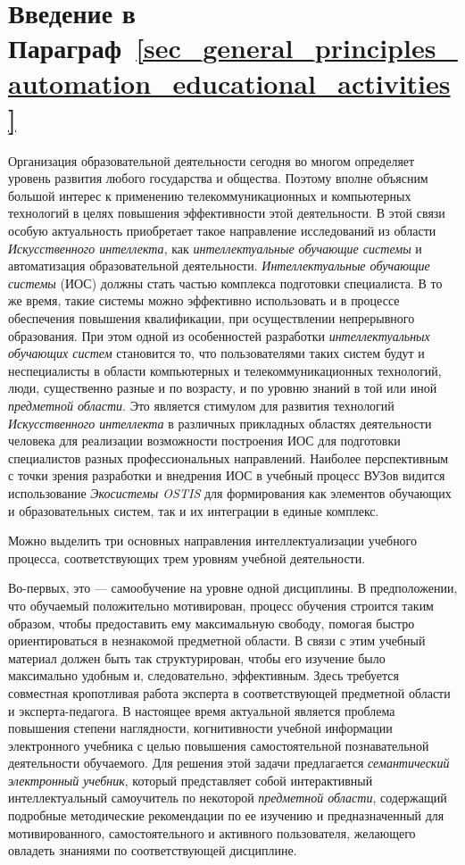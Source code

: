 \section*{Введение в Параграф~\ref{sec_general_principles_automation_educational_activities}}
Организация образовательной деятельности сегодня во многом определяет уровень развития любого государства и общества. Поэтому вполне объясним большой интерес к применению телекоммуникационных и компьютерных технологий в целях повышения эффективности этой деятельности. В этой связи особую актуальность приобретает такое направление исследований из области \textit{Искусственного интеллекта}, как \textit{интеллектуальные обучающие системы} и автоматизация образовательной деятельности. \textit{Интеллектуальные обучающие системы} (ИОС) должны стать частью комплекса подготовки специалиста. В то же время, такие системы можно эффективно использовать и в процессе обеспечения повышения квалификации, при осуществлении непрерывного образования. При этом одной из особенностей разработки \textit{интеллектуальных обучающих систем} становится то, что пользователями таких систем будут и неспециалисты в области компьютерных и телекоммуникационных технологий, люди, существенно разные и по возрасту, и по уровню знаний в той или иной \textit{предметной области}. Это является стимулом для развития технологий \textit{Искусственного интеллекта} в различных прикладных областях деятельности человека для реализации возможности построения ИОС для подготовки специалистов разных профессиональных направлений. Наиболее перспективным с точки зрения разработки и внедрения ИОС в учебный процесс ВУЗов видится использование \textit{Экосистемы OSTIS} для формирования как элементов обучающих и образовательных систем, так и их интеграции в единые комплекс.

Можно выделить три основных направления интеллектуализации учебного процесса, соответствующих трем уровням учебной деятельности.

Во-первых, это --- самообучение на уровне одной дисциплины. В предположении, что обучаемый положительно мотивирован, процесс обучения строится таким образом, чтобы предоставить ему максимальную свободу, помогая быстро ориентироваться в незнакомой предметной области. В связи с этим учебный материал должен быть так структурирован, чтобы его изучение было максимально удобным и, следовательно, эффективным. Здесь требуется совместная кропотливая работа эксперта в соответствующей предметной области и эксперта-педагога. В настоящее время актуальной является проблема повышения степени наглядности, когнитивности учебной информации электронного учебника с целью повышения самостоятельной познавательной деятельности обучаемого. Для решения этой задачи предлагается \textit{семантический электронный учебник}, который представляет собой интерактивный интеллектуальный самоучитель по некоторой \textit{предметной области}, содержащий подробные методические рекомендации по ее изучению и предназначенный для мотивированного, самостоятельного и активного пользователя, желающего овладеть знаниями по соответствующей дисциплине.

